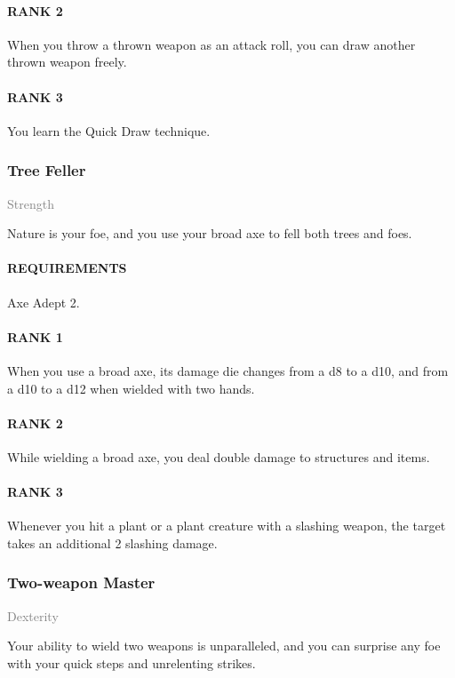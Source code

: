 \paragraph{RANK 2} When you throw a thrown weapon as an attack roll, you can draw another thrown weapon freely.
\paragraph{RANK 3} You learn the Quick Draw technique.

\subsubsection{Tree Feller} \label{feat::treefeller}
\small{\textcolor{gray}{Strength}}

\normalsize
Nature is your foe, and you use your broad axe to fell both trees and foes.
\paragraph{REQUIREMENTS} Axe Adept 2.
\paragraph{RANK 1} When you use a broad axe, its damage die changes from a d8 to a d10, and from a d10 to a d12 when wielded with two hands.
\paragraph{RANK 2} While wielding a broad axe, you deal double damage to structures and items.
\paragraph{RANK 3} Whenever you hit a plant or a plant creature with a slashing weapon, the target takes an additional 2 slashing damage.

\subsubsection{Two-weapon Master} \label{feat::twoweaponmaster}
\small{\textcolor{gray}{Dexterity}}

\normalsize
Your ability to wield two weapons is unparalleled, and you can surprise any foe with your quick steps and unrelenting strikes.
